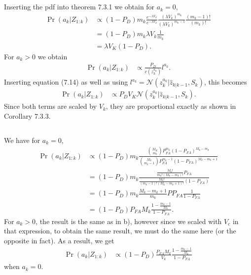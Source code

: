\documentclass[]{article}
\begin{document}
\subsection{}
Inserting the pdf into theorem 7.3.1 we obtain for $a_k = 0$,
\begin{equation}\begin{aligned}
\Pr(a_k | Z_{1:k})
&\propto (1 - P_D) m_k
\frac{e^{-\lambda V_k}}{e^{-\lambda V_k}}
\frac{(\lambda V_k)^{m_k}}{(\lambda V_k)^{m_k - 1}}
\frac{(m_k - 1)!}{(m_k)!} \\
&= (1 - P_D)m_k \lambda V_k \frac{1}{m_k} \\
&= \lambda V_K (1 - P_D).
\end{aligned}\end{equation}
For $a_k > 0$ we obtain
\begin{equation}\begin{aligned}
\Pr(a_k | Z_{1:k})
&\propto \frac{P_D}{c(z_k^{a_k})}l^{a_k}.
\end{aligned}\end{equation}
Inserting equation (7.14) as well as using $l^{a_k} = \mathcal{N}(z_k^{a_k} | \hat z_{k|k-1}, S_k)$, this becomes
\begin{equation}\begin{aligned}
\Pr(a_k | Z_{1:k})
&\propto P_D V_K \mathcal{N}(z_k^{a_k} | \hat z_{k|k-1}, S_k).
\end{aligned}\end{equation}
Since both terms are scaled by $V_k$, they are proportional exactly as shown in Corollary 7.3.3.

\subsection{}
We have for $a_k = 0$,
\begin{equation}\begin{aligned}
\Pr(a_k | Z_{1:k})
&\propto
(1 - P_D) m_k \frac{{M_K \choose m_k} P_{FA}^{m_k}(1 - P_{FA})^{M_k - m_k}}{{M_k \choose m_k - 1} P_{FA}^{m_k - 1}(1 - P_{FA})^{M_k - m_k + 1}} \\
&= (1 - P_D) m_k \frac{\frac{M_k!}{m_k !(M_k - m_k)!} P_{FA}}{\frac{M_k !}{(m_k - 1)!(M_k - m_k + 1)!}(1 - P_{FA})} \\
&= (1 - P_D) m_k \frac{M_k - m_k + 1}{m_k}PP_{FA} \frac{1}{1 - P_{FA}} \\
&= (1 - P_D) P_{FA}M_k \frac{1 - \frac{m_k - 1}{M_k}}{1 - P_{FA}}.
\end{aligned}\end{equation}
For $a_k > 0$, the result is the same as in b), however since we scaled with $V_c$ in that expression, to obtain the same result, we must do the same here (or the opposite in fact). As a result, we get
\begin{equation}\begin{aligned}
\Pr(a_k | Z_{1:k})
&\propto
(1 - P_D) \frac{P_{FA}M_k}{V_k} \frac{1 - \frac{m_k - 1}{M_k}}{1 - P_{FA}}
\end{aligned}\end{equation}
when $a_k = 0$.
\end{document}
